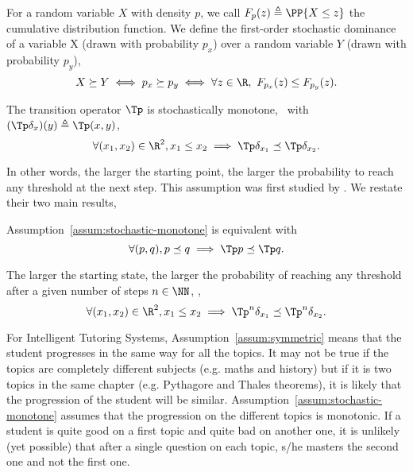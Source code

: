 For a random variable $X$ with density $p$, we call $F_{p}(z) \triangleq \PP{X\leq z}$ the cumulative distribution function. We define the first-order stochastic dominance of a variable X (drawn with probability $p_x$) over a random variable $Y$ (drawn with probability $p_y$),
\begin{equation}
\label{eq:stoch-dominance}
   X \succeq Y \iff p_x \succeq p_y \iff \forall z \in \R,\  F_{p_x}(z) \leq F_{p_y}(z). 
\end{equation}

\begin{assumption}
\label{assum:stochastic-monotone}
The transition operator $\Tp$ is stochastically monotone, \ie \ with $(\Tp\delta_x)(y) \triangleq \Tp(x,y)$,
\[
\forall (x_1,x_2)\in \R^2, x_1 \leq x_2 \implies  \Tp\delta_{x_1} \preceq \Tp\delta_{x_2}.
\]
\end{assumption}

In other words, the larger the starting point, the larger the probability to reach any threshold at the next step. This assumption was first studied by \citet{daley1968stochastically}. We restate their two main results,

\begin{lemma}
\label{lem:daley}
Assumption~\ref{assum:stochastic-monotone} is equivalent with 
\[
\forall (p,q), p \preceq q \implies  \Tp p \preceq \Tp q.
\]
\end{lemma}

\begin{corollary}
\label{cor:daley}
The larger the starting state, the larger the probability of reaching any threshold after a given number of steps $n\in \NN$, \ie, 
\[
\forall (x_1,x_2)\in \R^2, x_1 \leq x_2 \implies  \Tp^n\delta_{x_1} \preceq \Tp^n\delta_{x_2}.
\]
\end{corollary}
For Intelligent Tutoring Systems, Assumption~\ref{assum:symmetric} means that the student progresses in the same way for all the topics. It may not be true if the topics are completely different subjects (e.g. maths and history) but if it is two topics in the same chapter (e.g. Pythagore and Thales theorems), it is likely that the progression of the student will be similar. Assumption~\ref{assum:stochastic-monotone} assumes that the progression on the different topics is monotonic. If a student is quite good on a first topic and quite bad on another one, it is unlikely (yet possible) that after a single question on each topic, s/he masters the second one and not the first one. 

